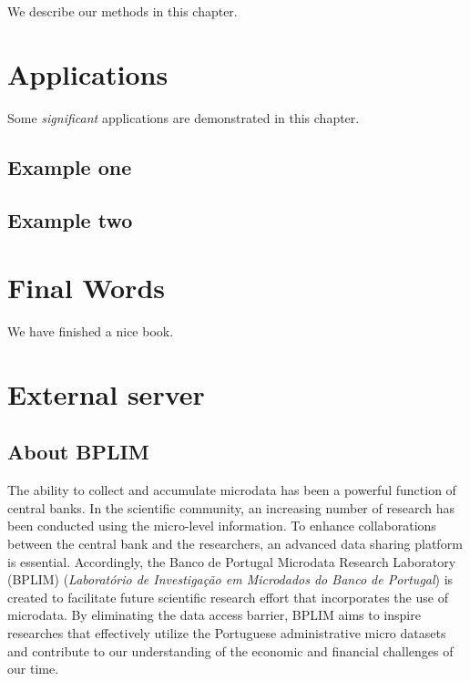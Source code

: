 \documentclass[]{book}
\begin{document}
We describe our methods in this chapter.

\hypertarget{applications}{%
\chapter{Applications}\label{applications}}

Some \emph{significant} applications are demonstrated in this chapter.

\hypertarget{example-one}{%
\section{Example one}\label{example-one}}

\hypertarget{example-two}{%
\section{Example two}\label{example-two}}

\hypertarget{final-words}{%
\chapter{Final Words}\label{final-words}}

We have finished a nice book.

\hypertarget{external}{%
\chapter{External server}\label{external}}

\hypertarget{about-bplim}{%
\section{\texorpdfstring{{About BPLIM}}{About BPLIM}}\label{about-bplim}}

The ability to collect and accumulate microdata has been a powerful
function of central banks. In the scientific community, an increasing
number of research has been conducted using the micro-level
information. To enhance collaborations between the central bank and
the researchers, an advanced data sharing platform is essential.
Accordingly, the Banco de Portugal Microdata Research Laboratory
(BPLIM) (\emph{Laboratório de Investigação em Microdados do Banco de
Portugal}) is created to facilitate future scientific research effort
that incorporates the use of microdata. By eliminating the data access
barrier, BPLIM aims to inspire researches that effectively utilize the
Portuguese administrative micro datasets and contribute to our
understanding of the economic and financial challenges of our time.
\end{document}

